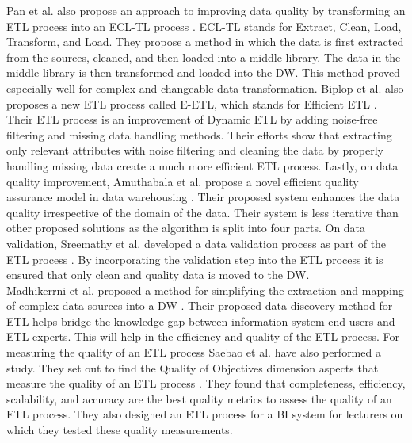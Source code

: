 \documentclass[11pt]{article}
\begin{document}
Pan et al. also propose an approach to improving data quality by transforming an ETL process into an ECL-TL process \cite{Pan2018275}. ECL-TL stands for Extract, Clean, Load, Transform, and Load. They propose a method in which the data is first extracted from the sources, cleaned, and then loaded into a middle library. The data in the middle library is then transformed and loaded into the DW. This method proved especially well for complex and changeable data transformation. Biplop et al. also proposes a new ETL process called E-ETL, which stands for Efficient ETL \cite{BadiuzzamanBiplob2022243}. Their ETL process is an improvement of Dynamic ETL by adding noise-free filtering and missing data handling methods. Their efforts show that extracting only relevant attributes with noise filtering and cleaning the data by properly handling missing data create a much more efficient ETL process. Lastly, on data quality improvement, Amuthabala et al. propose a novel efficient quality assurance model in data warehousing \cite{Amuthabala2019233}. Their proposed system enhances the data quality irrespective of the domain of the data. Their system is less iterative than other proposed solutions as the algorithm is split into four parts. On data validation, Sreemathy et al. developed a data validation process as part of the ETL process \cite{Sreemathy20191183}. By incorporating the validation step into the ETL process it is ensured that only clean and quality data is moved to the DW. \\

Madhikerrni et al. proposed a method for simplifying the extraction and mapping of complex data sources into a DW \cite{Madhikerrni2019174}. Their proposed data discovery method for ETL helps bridge the knowledge gap between information system end users and ETL experts. This will help in the efficiency and quality of the ETL process. For measuring the quality of an ETL process Saebao et al. have also performed a study. They set out to find the Quality of Objectives dimension aspects that measure the quality of an ETL process \cite{Saebao2020539}. They found that completeness, efficiency, scalability, and accuracy are the best quality metrics to assess the quality of an ETL process. They also designed an ETL process for a BI system for lecturers on which they tested these quality measurements. \\
\end{document}
